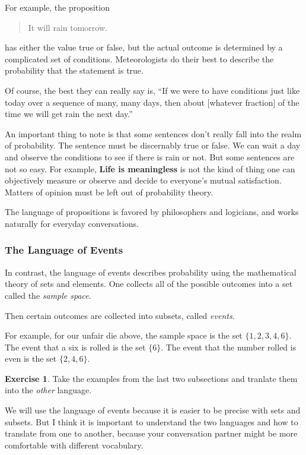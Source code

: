 \documentclass[12pt,letterpaper]{article}
\theoremstyle{definition}
\newtheorem{exercise}[question]{Exercise}
\begin{document}
For example, the proposition
\begin{quote}
It will rain tomorrow.
\end{quote}
has either the value true or false, but the actual outcome is determined by a complicated set of conditions.
Meteorologists do their best to describe the probability that the statement is true.

Of course, the best they can really say is, ``If we were to have conditions just like today over a sequence of many, many days, then about [whatever fraction] of the time we will get rain the next day.''

An important thing to note is that some sentences don't really fall into the realm of probability.
The sentence must be discernably true or false.
We can wait a day and observe the conditions to see if there is rain or not. 
But some sentences are not so easy.
For example, \textbf{Life is meaningless} is not the kind of thing one can objectively measure or observe and decide to everyone's mutual satisfaction.
Matters of opinion must be left out of probability theory.

The language of propositions is favored by philosophers and logicians, and works naturally for everyday conversations.

\subsubsection*{The Language of Events}

In contrast, the language of events describes probability using the mathematical theory of sets and elements.
One collects all of the possible outcomes into a set called the \emph{sample space}.

Then certain outcomes are collected into subsets, called \emph{events}.

For example, for our unfair die above, the sample space is the set $\{1,2,3,4,6\}$.
The event that a six is rolled is the set $\{6\}$.
The event that the number rolled is even is the set $\{2,4,6\}$.

\begin{exercise}
Take the examples from the last two subsections and tranlate them into the \emph{other} language.
\end{exercise}

We will use the language of events because it is easier to be precise with sets and subsets.
But I think it is important to understand the two languages and how to translate from one to another, because your conversation partner might be more comfortable with different vocabulary.
\end{document}

